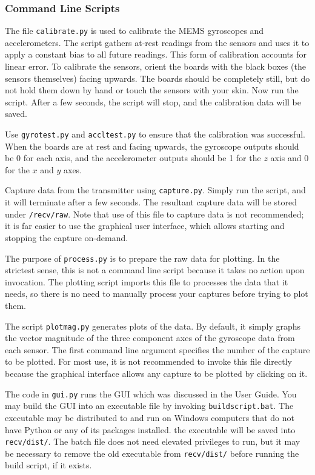 \documentclass{article}
\begin{document}
        \subsubsection{Command Line Scripts}
        The file \texttt{calibrate.py} is used to calibrate the MEMS gyroscopes and accelerometers. The script gathers at-rest readings from the sensors and uses it to apply a constant bias to all future readings. This form of calibration accounts for linear error. To calibrate the sensors, orient the boards with the black boxes (the sensors themselves) facing upwards. The boards should be completely still, but do not hold them down by hand or touch the sensors with your skin. Now run the script. After a few seconds, the script will stop, and the calibration data will be saved.
        
        Use \texttt{gyro\textunderscore test.py} and \texttt{accl\textunderscore test.py} to ensure that the calibration was successful. When the boards are at rest and facing upwards, the gyroscope outputs should be 0 for each axis, and the accelerometer outputs should be 1 for the $z$ axis and 0 for the $x$ and $y$ axes.
        
        Capture data from the transmitter using \texttt{capture.py}. Simply run the script, and it will terminate after a few seconds. The resultant capture data will be stored under \texttt{/recv/raw}. Note that use of this file to capture data is not recommended; it is far easier to use the graphical user interface, which allows starting and stopping the capture on-demand.
        
        The purpose of \texttt{process.py} is to prepare the raw data for plotting. In the strictest sense, this is not a command line script because it takes no action upon invocation. The plotting script imports this file to processes the data that it needs, so there is no need to manually process your captures before trying to plot them.
        
        The script \texttt{plot\textunderscore mag.py} generates plots of the data. By default, it simply graphs the vector magnitude of the three component axes of the gyroscope data from each sensor. The first command line argument specifies the number of the capture to be plotted. For most use, it is not recommended to invoke this file directly because the graphical interface allows any capture to be plotted by clicking on it.
        
        The code in \texttt{gui.py} runs the GUI which was discussed in the User Guide. You may build the GUI into an executable file by invoking \texttt{build\textunderscore script.bat}. The executable may be distributed to and run on Windows computers that do not have Python or any of its packages installed. the executable will be saved into \texttt{recv/dist/}. The batch file does not need elevated privileges to run, but it may be necessary to remove the old executable from \texttt{recv/dist/} before running the build script, if it exists.
        
\end{document}

